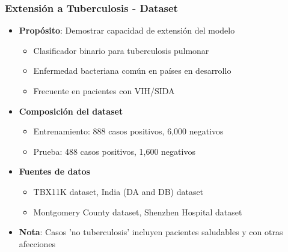 \begin{frame}
\frametitle{Extensión a Tuberculosis - Dataset}
\begin{itemize}
    \item \textbf{Propósito}: Demostrar capacidad de extensión del modelo
    \begin{itemize}
        \item Clasificador binario para tuberculosis pulmonar
        \item Enfermedad bacteriana común en países en desarrollo
        \item Frecuente en pacientes con VIH/SIDA
    \end{itemize}
    \item \textbf{Composición del dataset}
    \begin{itemize}
        \item Entrenamiento: 888 casos positivos, 6,000 negativos
        \item Prueba: 488 casos positivos, 1,600 negativos
    \end{itemize}
    \item \textbf{Fuentes de datos}
    \begin{itemize}
        \item TBX11K dataset, India (DA and DB) dataset
        \item Montgomery County dataset, Shenzhen Hospital dataset
    \end{itemize}
    \item \textbf{Nota}: Casos 'no tuberculosis' incluyen pacientes saludables y con otras afecciones
\end{itemize}
\end{frame}

